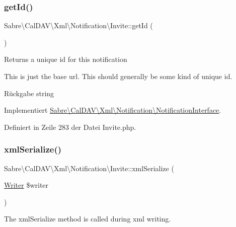 \subsubsection{\texorpdfstring{get\+Id()}{getId()}}
{\footnotesize\ttfamily Sabre\textbackslash{}\+Cal\+D\+A\+V\textbackslash{}\+Xml\textbackslash{}\+Notification\textbackslash{}\+Invite\+::get\+Id (\begin{DoxyParamCaption}{ }\end{DoxyParamCaption})}

Returns a unique id for this notification

This is just the base url. This should generally be some kind of unique id.

\begin{DoxyReturn}{Rückgabe}
string 
\end{DoxyReturn}


Implementiert \mbox{\hyperlink{interface_sabre_1_1_cal_d_a_v_1_1_xml_1_1_notification_1_1_notification_interface_a5fada5863f3ce0575c92bf56d4c76fdc}{Sabre\textbackslash{}\+Cal\+D\+A\+V\textbackslash{}\+Xml\textbackslash{}\+Notification\textbackslash{}\+Notification\+Interface}}.



Definiert in Zeile 283 der Datei Invite.\+php.

\mbox{\label{class_sabre_1_1_cal_d_a_v_1_1_xml_1_1_notification_1_1_invite_a47eb1187c379ceed37748741294e3760}} 
\subsubsection{\texorpdfstring{xml\+Serialize()}{xmlSerialize()}}
{\footnotesize\ttfamily Sabre\textbackslash{}\+Cal\+D\+A\+V\textbackslash{}\+Xml\textbackslash{}\+Notification\textbackslash{}\+Invite\+::xml\+Serialize (\begin{DoxyParamCaption}\item[{\mbox{\hyperlink{class_sabre_1_1_xml_1_1_writer}{Writer}}}]{\$writer }\end{DoxyParamCaption})}

The xml\+Serialize method is called during xml writing.

